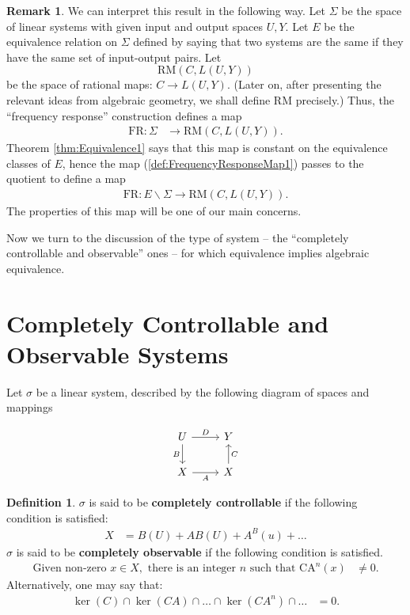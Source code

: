 \documentclass[12pt]{book}
\theoremstyle{plain}
\theoremstyle{definition}
\newtheorem{definition}{Definition}[section]
\newtheorem*{remark}{Remark}
\begin{document}
\begin{remark}
    We can interpret this result in the following way.
    Let $\Sigma$ be the space of linear systems with given input and output spaces $U, Y$.
    Let $E$ be the equivalence relation on $\Sigma$ defined by saying that two systems are the same if they have the same set of input-output pairs.
    Let
    $$\textrm{RM}(C, L(U, Y))$$
    be the space of rational maps: $C \to L(U, Y)$.
    (Later on, after presenting the relevant ideas from algebraic geometry, we shall define $\textrm{RM}$ precisely.)
    Thus, the ``frequency response'' construction defines a map
    \begin{align} \label{def:FrequencyResponseMap1}
        \textrm{FR}: \Sigma &\to \textrm{RM}(C, L(U, Y)).
    \end{align}
    Theorem \ref{thm:Equivalence1} says that this map is constant on the equivalence classes of $E$, hence the map (\ref{def:FrequencyResponseMap1}) passes to the quotient to define a map
    \begin{align}
        \textrm{FR}: E\backslash\Sigma \to \textrm{RM}(C, L(U, Y)).
    \end{align}
    The properties of this map will be one of our main concerns.
\end{remark}

Now we turn to the discussion of the type of system -- the ``completely controllable and observable'' ones -- for which equivalence implies algebraic equivalence.

\section{Completely Controllable and Observable Systems}
Let $\sigma$ be a linear system, described by the following diagram of spaces and mappings

\begin{equation}
\begin{tikzcd} \label{diag:LinearSystem1}
U \ar[r,"D"] \ar[d,"B"'] & Y \\
X \ar[r,"A"'] & X \ar[u,"C"']
\end{tikzcd}
\end{equation}

\begin{definition}
    $\sigma$ is said to be \textbf{completely controllable} if the following condition is satisfied:
    \begin{align}
        X &= B(U) + AB(U) + A^B(u) + \dots
    \end{align}
    $\sigma$ is said to be \textbf{completely observable} if the following condition is satisfied.
    \begin{align} \label{eq:CompletelyObservableCondition1}
        \text{Given non-zero } x \in X, \text{ there is an integer } n \text{ such that } \textrm{CA}^n(x) &\neq 0.
    \end{align}
    Alternatively, one may say that:
    \begin{align} \label{eq:CompletelyObservableCondition2}
        \ker(C) \cap \ker(CA) \cap \dots \cap  \ker(CA^n) \cap \dots &= 0.
    \end{align}
\end{definition}
\end{document}
